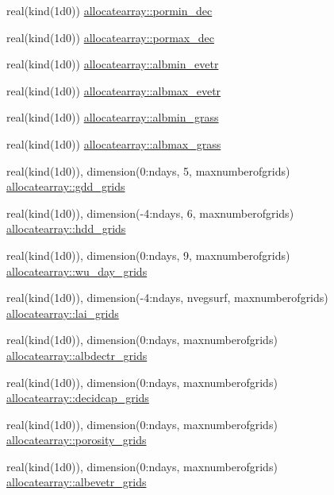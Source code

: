 \begin{DoxyCompactItemize}
\item 
real(kind(1d0)) \hyperlink{namespaceallocatearray_ac4df536a53bb496d38aca9441ccf18f6}{allocatearray\+::pormin\+\_\+dec}
\item 
real(kind(1d0)) \hyperlink{namespaceallocatearray_a077f163b1bb6fc5d136d362575a1294e}{allocatearray\+::pormax\+\_\+dec}
\item 
real(kind(1d0)) \hyperlink{namespaceallocatearray_afcc1bdcc6f5b7852565fb1489a7c4580}{allocatearray\+::albmin\+\_\+evetr}
\item 
real(kind(1d0)) \hyperlink{namespaceallocatearray_ad0dd8a369c80ba1304fb195ba4fc0ec6}{allocatearray\+::albmax\+\_\+evetr}
\item 
real(kind(1d0)) \hyperlink{namespaceallocatearray_a1dd0b37af5b6a2ba51c098d07cb6a3bc}{allocatearray\+::albmin\+\_\+grass}
\item 
real(kind(1d0)) \hyperlink{namespaceallocatearray_ac423a128522b5c306be8442abe8257cd}{allocatearray\+::albmax\+\_\+grass}
\item 
real(kind(1d0)), dimension(0\+:ndays, 5, maxnumberofgrids) \hyperlink{namespaceallocatearray_a8102d2a0006650f97b2b240a515fffac}{allocatearray\+::gdd\+\_\+grids}
\item 
real(kind(1d0)), dimension(-\/4\+:ndays, 6, maxnumberofgrids) \hyperlink{namespaceallocatearray_a611f940db5f9be9de91624d968683688}{allocatearray\+::hdd\+\_\+grids}
\item 
real(kind(1d0)), dimension(0\+:ndays, 9, maxnumberofgrids) \hyperlink{namespaceallocatearray_a979667a8feb8a3b2e63bedfbb7e25972}{allocatearray\+::wu\+\_\+day\+\_\+grids}
\item 
real(kind(1d0)), dimension(-\/4\+:ndays, nvegsurf, maxnumberofgrids) \hyperlink{namespaceallocatearray_a03eaebbd64063714bff3eaac0920e483}{allocatearray\+::lai\+\_\+grids}
\item 
real(kind(1d0)), dimension(0\+:ndays, maxnumberofgrids) \hyperlink{namespaceallocatearray_a1aa983c3d70fa00f3ff15a9eee247852}{allocatearray\+::albdectr\+\_\+grids}
\item 
real(kind(1d0)), dimension(0\+:ndays, maxnumberofgrids) \hyperlink{namespaceallocatearray_a346cb07a7ef17556940b2325e8d43cf5}{allocatearray\+::decidcap\+\_\+grids}
\item 
real(kind(1d0)), dimension(0\+:ndays, maxnumberofgrids) \hyperlink{namespaceallocatearray_a904d246737e2626f58f7392e4c610372}{allocatearray\+::porosity\+\_\+grids}
\item 
real(kind(1d0)), dimension(0\+:ndays, maxnumberofgrids) \hyperlink{namespaceallocatearray_a052b2b45bd4ba25496922415f3af59b3}{allocatearray\+::albevetr\+\_\+grids}

\end{DoxyCompactItemize}
